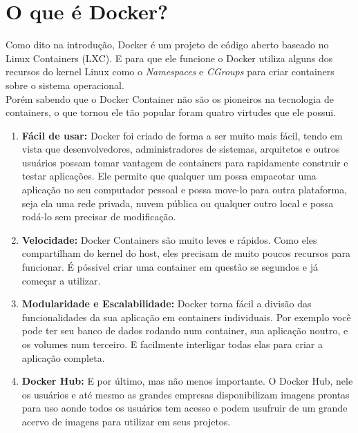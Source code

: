\documentclass[twocolumn, letterpaper]{scrartcl}
\begin{document}
\section*{\color{triton_blue}O que é Docker?}
Como dito na introdução, Docker é um projeto de código aberto baseado no Linux Containers (LXC). E para que ele funcione o Docker utiliza alguns dos recursos do kernel Linux como o \textit{Namespaces} e \textit{CGroups} para criar containers sobre o sistema operacional.\\
Porém sabendo que o Docker Container não são os pioneiros na tecnologia de containers, o que tornou ele tão popular foram quatro virtudes que ele possui.
\begin{enumerate}
    \item \textbf{Fácil de usar:} Docker foi criado de forma a ser muito mais fácil, tendo em vista que desenvolvedores, administradores de sistemas, arquitetos e outros usuários possam tomar vantagem de containers para rapidamente construir e testar aplicações. Ele permite que qualquer um possa empacotar uma aplicação no seu computador pessoal e possa move-lo para outra plataforma, seja ela uma rede privada, nuvem pública ou qualquer outro local e possa rodá-lo sem precisar de modificação.
    \item \textbf{Velocidade:} Docker Containers são muito leves e rápidos. Como eles compartilham do kernel do host, eles precisam de muito poucos recursos para funcionar. É póssivel criar uma container em questão se segundos e já começar a utilizar.
    \item \textbf{Modularidade e Escalabilidade:} Docker torna fácil a divisão das funcionalidades da sua aplicação em containers individuais. Por exemplo você pode ter seu banco de dados rodando num container, sua aplicação noutro, e os volumes num terceiro. E facilmente interligar todas elas para criar a aplicação completa.
    \item \textbf{Docker Hub:} E por último, mas não menos importante. O Docker Hub, nele os usuários e até mesmo as grandes empresas disponibilizam imagens prontas para uso aonde todos os usuários tem acesso e podem usufruir de um grande acervo de imagens para utilizar em seus projetos.
\end{enumerate}
\end{document}

